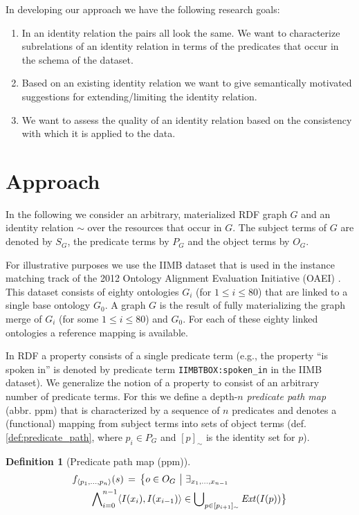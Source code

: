 \documentclass[letterpaper]{article}
\newtheorem{definition}{Definition}
\newcommand{\bigsetdef}[2]{\big\{#1\,\,\big\vert\,\,#2\big\}}
\newcommand{\pair}[2]{\langle#1,#2\rangle}
\newcommand{\range}[2]{#1, \ldots, #2}
\newcommand{\tuple}[1]{\langle#1\rangle}
\begin{document}
In developing our approach we have the following research goals:
\begin{enumerate}
\item In an identity relation the pairs all look the same.
      We want to characterize subrelations of an identity relation in terms
      of the predicates that occur in the schema of the dataset.
\item Based on an existing identity relation we want to give semantically
      motivated suggestions for extending/limiting the identity relation.
\item We want to assess the quality of an identity relation based on
      the consistency with which it is applied to the data.
\end{enumerate}

\section{Approach}
\label{sec:approach}

In the following we consider an arbitrary,
  materialized RDF graph $G$ and an identity relation $\sim$ over
  the resources that occur in $G$.
The subject terms of $G$ are denoted by $S_G$, the predicate terms by $P_G$
  and the object terms by $O_G$.

For illustrative purposes we use the IIMB dataset that is used in the
  instance matching track of the 2012 Ontology Alignment Evaluation
  Initiative (OAEI) \cite{oaei_2012}.
This dataset consists of eighty ontologies $G_i$ (for $1 \leq i \leq 80$)
  that are linked to a single base ontology $G_0$.
A graph $G$ is the result of fully materializing the graph merge
  of $G_i$ (for some $1 \leq i \leq 80$) and $G_0$.
For each of these eighty linked ontologies a reference mapping is available.

In RDF a property consists of a single predicate term
  (e.g., the property ``is spoken in'' is denoted by predicate term
   \verb|IIMBTBOX:spoken_in| in the IIMB dataset).
We generalize the notion of a property to consist of
  an arbitrary number of predicate terms.
For this we define a depth-$n$ \emph{predicate path map} (abbr. ppm)
  that is characterized by a sequence of $n$ predicates
  and denotes a (functional) mapping from subject terms
  into sets of object terms
  (def. \ref{def:predicate_path},
   where $p_i \in P_G$ and $[p]_{\sim}$ is the identity set for $p$).

\small
\begin{definition}[Predicate path map (ppm)]
\begin{align}
\label{def:predicate_path}
  f_{\tuple{\range{p_1}{p_n}}}(s)
\,=\,
  \bigsetdef{o \in O_G}{
    \exists_{\range{x_1}{x_{n-1}}} \quad \quad \quad \quad \quad \quad\\
      \bigwedge_{i=0}^{n-1}\nolimits
          \pair{I(x_i)}{I(x_{i-1})}
        \in
          \bigcup_{p \in [p_{i+1}]_{\sim}}\nolimits \mathit{Ext}(I(p))
  }\nonumber
\end{align}
\end{definition}
\normalsize
\end{document}
